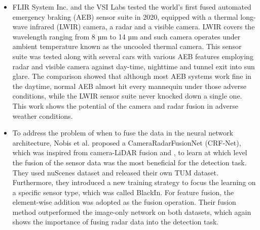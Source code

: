 \documentclass[rnd]{mas_proposal}
\begin{document}
\begin{itemize}
      \item FLIR System Inc. \cite{fused_aeb} and the VSI Labs \cite{VSILabs} tested the world’s first fused automated emergency braking (AEB) sensor suite in 2020, equipped with a thermal long-wave infrared (LWIR) camera, a radar and a visible camera. LWIR covers the wavelength ranging from 8 µm to 14 µm and such camera operates under ambient temperature known as the uncooled thermal camera. This sensor suite was tested along with several cars with various AEB features employing radar and visible camera against day-time, nighttime and tunnel exit into sun glare. The comparison showed that although most AEB systems work fine in the daytime, normal AEB almost hit every mannequin under those adverse conditions, while the LWIR sensor suite never knocked down a single one. This work shows the potential of the camera and radar fusion in adverse weather conditions.
      
      \item To address the problem of when to fuse the data in the neural network architecture, Nobis et al. \cite{nobis2019deep} proposed a CameraRadarFusionNet (CRF-Net), which was inspired from camera-LiDAR fusion \cite{yu2019multi} and \cite{caltagirone2019lidar}, to learn at which level the fusion of the sensor data was the most beneficial for the detection task. They used nuScenes \cite{caesar2020nuscenes} dataset and released their own TUM dataset. Furthermore, they introduced a new training strategy to focus the learning on a specific sensor type, which was called BlackIn. For feature fusion, the element-wise addition was adopted as the fusion operation. Their fusion method outperformed the image-only network on both datasets, which again shows the importance of fusing radar data into the detection task.
      

\end{itemize}
\end{document}
